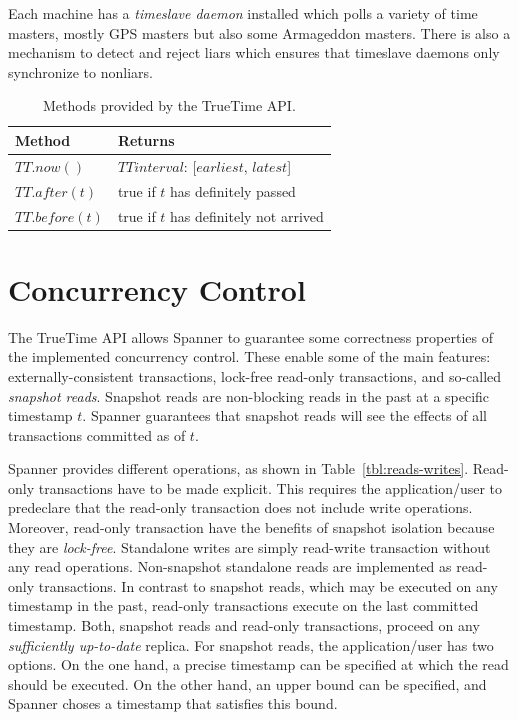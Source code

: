 \documentclass[onecolumn, a4paper, 10pt]{article}
\begin{document}
Each machine has a \emph{timeslave daemon} installed which polls a variety of
time masters, mostly GPS masters but also some Armageddon masters. There is also
a mechanism to detect and reject liars which ensures that timeslave daemons only
synchronize to nonliars. 

\begin{table}[ht]
  \centering
  \begin{tabular}{|l||l|}
    \hline
    {\bfseries Method} & {\bfseries Returns} \tabularnewline
    \hline\hline
    $TT.now()$ & $TTinterval$: [$earliest$, $latest$] \tabularnewline
    \hline
    $TT.after(t)$ & true if $t$ has definitely passed \tabularnewline
    \hline
    $TT.before(t)$ & true if $t$ has definitely not arrived \tabularnewline
    \hline
  \end{tabular}
  \caption{Methods provided by the TrueTime API.}
  \label{tbl:truetime-api}
\end{table}

\section{Concurrency Control}
\label{sec:concurrency-control}

The TrueTime API allows Spanner to guarantee some correctness properties of the
implemented concurrency control. These enable some of the main features:
externally-consistent transactions, lock-free read-only transactions, and
so-called \emph{snapshot reads}. Snapshot reads are non-blocking reads in the
past at a specific timestamp $t$. Spanner guarantees that snapshot reads will
see the effects of all transactions committed as of $t$.

Spanner provides different operations, as shown in Table~\ref{tbl:reads-writes}.
Read-only transactions have to be made explicit. This requires the
application/user to predeclare that the read-only transaction does not include
write operations. Moreover, read-only transaction have the benefits of snapshot
isolation because they are \emph{lock-free}. Standalone writes are simply
read-write transaction without any read operations. Non-snapshot standalone reads
are implemented as read-only transactions. In contrast to snapshot reads, which
may be executed on any timestamp in the past, read-only transactions execute on
the last committed timestamp. Both, snapshot reads and read-only transactions,
proceed on any \emph{sufficiently up-to-date} replica. For snapshot reads,
the application/user has two options. On the one hand, a precise timestamp can
be specified at which the read should be executed. On the other hand, an upper
bound can be specified, and Spanner choses a timestamp that satisfies this bound.
\end{document}
